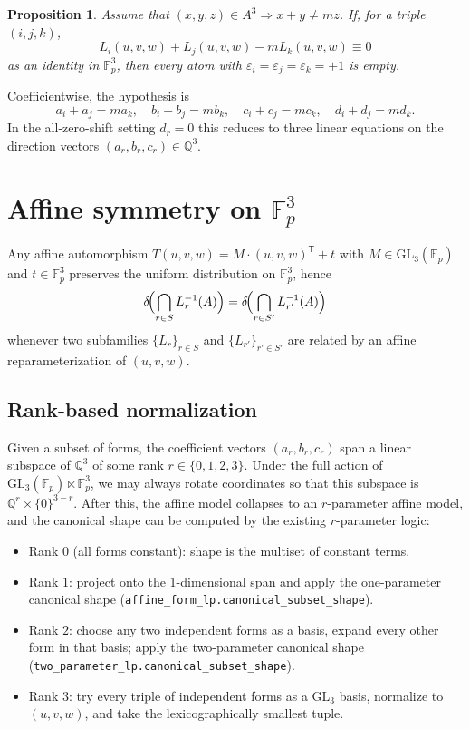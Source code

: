 \documentclass[11pt]{article}
\newtheorem{proposition}{Proposition}
\begin{document}
\begin{proposition}\label{prop:forbidden}
Assume that $(x,y,z)\in A^3\Rightarrow x+y\ne mz$. If, for a triple $(i,j,k)$,
\[
L_i(u,v,w)+L_j(u,v,w)-m L_k(u,v,w)\equiv 0
\]
as an identity in $\mathbb{F}_p^3$, then every atom with
$\varepsilon_i=\varepsilon_j=\varepsilon_k=+1$ is empty.
\end{proposition}

Coefficientwise, the hypothesis is
\[
a_i+a_j=ma_k,\quad
b_i+b_j=mb_k,\quad
c_i+c_j=mc_k,\quad
d_i+d_j=md_k.
\]
In the all-zero-shift setting $d_r=0$ this reduces to three linear equations on
the direction vectors $(a_r,b_r,c_r)\in\mathbb{Q}^3$.

\section{Affine symmetry on $\mathbb{F}_p^3$}

Any affine automorphism $T(u,v,w)=M\cdot(u,v,w)^{\mathsf T}+t$ with
$M\in\mathrm{GL}_3(\mathbb{F}_p)$ and $t\in\mathbb{F}_p^3$ preserves the
uniform distribution on $\mathbb{F}_p^3$, hence
\[
\delta\!\Bigl(\bigcap_{r\in S} L_r^{-1}(A)\Bigr)
=
\delta\!\Bigl(\bigcap_{r\in S'} L_{r'}^{-1}(A)\Bigr)
\]
whenever two subfamilies $\{L_r\}_{r\in S}$ and $\{L_{r'}\}_{r'\in S'}$ are
related by an affine reparameterization of $(u,v,w)$.

\subsection*{Rank-based normalization}

Given a subset of forms, the coefficient vectors $(a_r,b_r,c_r)$ span a linear
subspace of $\mathbb{Q}^3$ of some rank $r\in\{0,1,2,3\}$. Under the full
action of $\mathrm{GL}_3(\mathbb{F}_p)\ltimes\mathbb{F}_p^3$, we may always
rotate coordinates so that this subspace is $\mathbb{Q}^r\times\{0\}^{3-r}$.
After this, the affine model collapses to an $r$-parameter affine model, and
the canonical shape can be computed by the existing $r$-parameter logic:

\begin{itemize}
\item Rank $0$ (all forms constant): shape is the multiset of constant terms.
\item Rank $1$: project onto the 1-dimensional span and apply the one-parameter
canonical shape (\texttt{affine\_form\_lp.canonical\_subset\_shape}).
\item Rank $2$: choose any two independent forms as a basis, expand every other
form in that basis; apply the two-parameter canonical shape
(\texttt{two\_parameter\_lp.canonical\_subset\_shape}).
\item Rank $3$: try every triple of independent forms as a $\mathrm{GL}_3$ basis,
normalize to $(u,v,w)$, and take the lexicographically smallest tuple.
\end{itemize}
\end{document}
